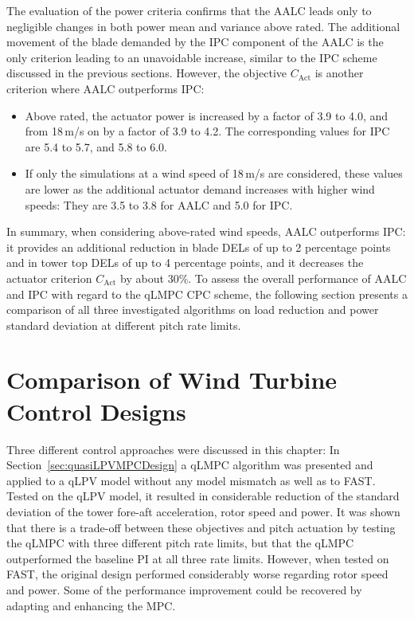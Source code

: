 %
The evaluation of the power criteria confirms that the AALC leads only to negligible changes in both power mean and variance above rated. The additional movement of the blade demanded by the IPC component of the AALC is the only criterion leading to an unavoidable increase, similar to the IPC scheme discussed in the previous sections. However, the objective $C_{\text{Act}}$ is another criterion where AALC outperforms IPC: 
\begin{itemize}
    \item Above rated, the actuator power is increased by a factor of 3.9 to 4.0, and from 18\,m/s on by a factor of 3.9 to 4.2. The corresponding values for IPC are 5.4 to 5.7, and 5.8 to 6.0.
    \item If only the simulations at a wind speed of 18\,m/s are considered, these values are lower as the additional actuator demand increases with higher wind speeds: They are 3.5 to 3.8 for AALC and 5.0 for IPC.
\end{itemize}
In summary, when considering above-rated wind speeds, AALC outperforms IPC: it provides an additional reduction in blade DELs of up to 2 percentage points and in tower top DELs of up to 4 percentage points, and it decreases the actuator criterion $C_{\text{Act}}$ by about 30\%. To assess the overall performance of AALC and IPC with regard to the qLMPC CPC scheme, the following section presents a comparison of all three investigated algorithms on load reduction and power standard deviation at different pitch rate limits.



\section{Comparison of Wind Turbine Control Designs}
\label{subsec:ComparisonWindTurbineControlDesigns}

Three different control approaches were discussed in this chapter: In Section~\ref{sec:quasiLPVMPCDesign} a qLMPC algorithm was presented and applied to a qLPV model without any model mismatch as well as to FAST. Tested on the qLPV model, it resulted in considerable reduction of the standard deviation of the tower fore-aft acceleration, rotor speed and power. It was shown that there is a trade-off between these objectives and pitch actuation by testing the qLMPC with three different pitch rate limits, but that the qLMPC outperformed the baseline PI at all three rate limits. However, when tested on FAST, the original design performed considerably worse regarding rotor speed and power. Some of the performance improvement could be recovered by adapting and enhancing the MPC. 

